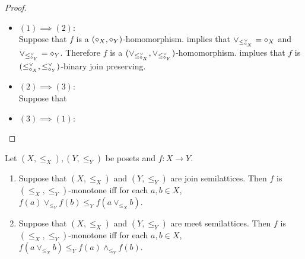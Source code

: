 \documentclass{book}
\begin{document}
	\begin{proof}\
		\begin{itemize}
			\item $(1) \implies (2)$: \\
			Suppose that $f$ is a $(\diamond_X, \diamond_Y)$-homomorphism.  implies that $\vee_{\leq_{\diamond_X}^{\vee}} = \diamond_X$ and $\vee_{\leq_{\diamond_Y}^{\vee}} = \diamond_Y$. Therefore $f$ is a $(\vee_{\leq_{\diamond_X}^{\vee}}, \vee_{\leq_{\diamond_Y}^{\vee}})$-homomorphism.  implues that $f$ is $(\leq_{\diamond_X}^{\vee}, \leq_{\diamond_Y}^{\vee})$-binary join preserving.
			\item $(2) \implies (3)$: \\
			Suppose that 
			\item $(3) \implies (1)$: \\
		\end{itemize}
	\end{proof}
	
	\begin{ex}
		Let $(X, \leq_X), (Y, \leq_Y)$ be posets and $f:X \rightarrow Y$. 
		\begin{enumerate}
			\item Suppose that $(X, \leq_X)$ and $(Y, \leq_Y)$ are join semilattices. Then $f$ is $(\leq_X, \leq_Y)$-monotone iff for each $a,b \in X$, $f(a) \vee_{\leq_Y} f(b) \leq_Y f(a \vee_{\leq_X} b)$.
			\item Suppose that $(X, \leq_X)$ and $(Y, \leq_Y)$ are meet semilattices. Then $f$ is $(\leq_X, \leq_Y)$-monotone iff for each $a,b \in X$, $f(a \vee_{\leq_X} b) \leq_Y f(a) \wedge_{\leq_Y} f(b)$.
		\end{enumerate}
	\end{ex}
	
\end{document}
